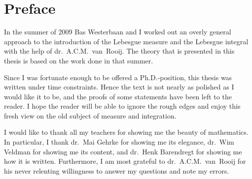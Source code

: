 \documentclass[main.tex]{subfiles}
\begin{document}
\section*{Preface}
\noindent
In the summer of 2009  Bas Westerbaan
and I worked out an 
overly general approach
to the introduction of the Lebesgue measure and the Lebesgue integral
with the help of dr.~A.C.M.~van~Rooij.
The theory that is presented in this thesis
is based on the work done in that summer.

Since I was fortunate enough to be offered
a Ph.D.-position,
this thesis was written under time constraints.
Hence the text is not nearly as polished as 
I would like it to be,
and the proofs of some statements
have been left to the reader.
I hope the reader will be able to ignore the rough edges
and enjoy this fresh view on the old subject
of measure and integration.

I would like to thank  all my teachers
for showing me the beauty of mathematics.
In particular, I  thank
dr.~Mai Gehrke for showing me its elegance,
dr.~Wim Veldman for showing me its content, and
dr.~Henk Barendregt for showing me how it is written.
Furthermore, I am most grateful
to dr.~A.C.M.~van~Rooij
for his never relenting willingness 
to answer my questions
and note my errors.
\clearpage
\thispagestyle{empty}
\tableofcontents
\clearpage
\end{document}
